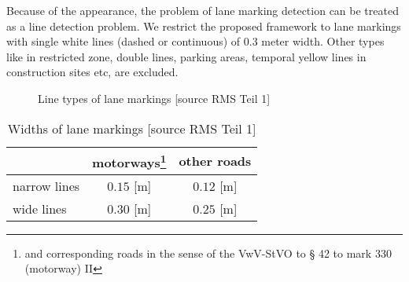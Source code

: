 Because of the appearance, the problem of lane marking detection can be treated as a line detection problem. We restrict the proposed framework to lane markings with single white lines (dashed or continuous) of 0.3 meter width. Other types like in restricted zone, double lines, parking areas, temporal yellow lines in construction sites etc, are excluded.%


\begin{figure}
	\centering
	\quad
	\newline
	\quad
	\quad
	\caption{\small Line types of lane markings [source RMS Teil 1]}
	\label{fig:LaneMarkingTypes}
\end{figure}

\begin{table} [h!]
	\centering
	\begin{tabular}{l|cc}
		\toprule
		& motorways\footnote{\label{motorway}and corresponding roads in the sense of the VwV-StVO to § 42 to mark 330 (motorway) II} & other roads\\
		\midrule
		narrow lines & $0.15$ [m] & $0.12$ [m] \\
		wide lines   & $0.30$ [m] & $0.25$ [m] \\
		\bottomrule
	\end{tabular}
	\caption{\small Widths of lane markings [source RMS Teil 1]}
	\label{tab:LaneMarkingWidths}
	
\end{table}

